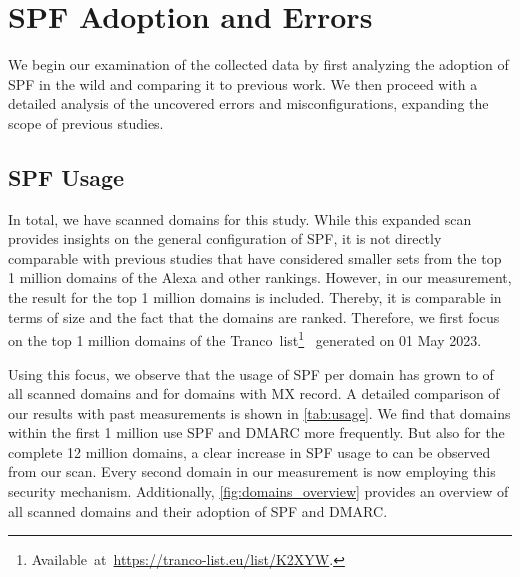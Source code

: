\section{SPF Adoption and Errors}
\label{sec:errors}

We begin our examination of the collected data by first analyzing the adoption of SPF in the wild and comparing it to previous work. We then proceed with a detailed analysis of the uncovered errors and misconfigurations, expanding the scope of previous studies.


\subsection{SPF Usage}

In total, we have scanned \numprint{\scannedDomains} domains for this study.
While this expanded scan provides insights on the general configuration of SPF, it is not directly comparable with previous studies that have considered smaller sets from the top 1 million domains of the Alexa and other rankings.
However, in our measurement, the result for the top 1 million domains is included. Thereby, it is comparable in terms of size and the fact that the domains are ranked.
Therefore, we first focus on the top 1 million domains of the \mbox{Tranco list\footnote{Available at \url{https://tranco-list.eu/list/K2XYW}.} \citep{TrancoList}} generated on 01 May 2023. %

Using this focus, we observe that the usage of SPF per domain has grown to \SPFDomainsMPerc of all scanned domains and \SPFDomainsMXPerc for domains with MX record.
A detailed comparison of our results with past measurements is shown in \autoref{tab:usage}.
We find that domains within the first 1 million use SPF and DMARC more frequently.
But also for the complete 12 million domains, a clear increase in SPF usage to \SPFDomainsPerc can be observed from our scan. Every second domain in our measurement is now employing this security mechanism.
Additionally,  \autoref{fig:domains_overview} provides an overview of all scanned domains and their adoption of SPF and DMARC.

